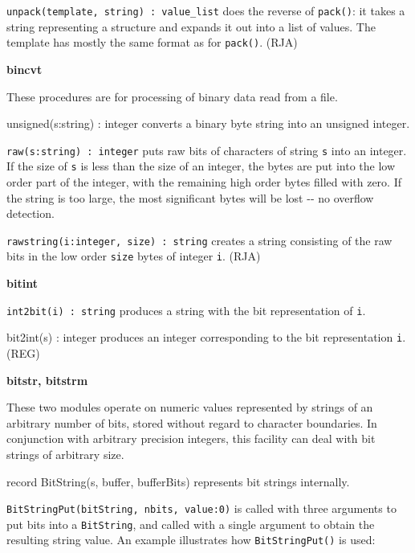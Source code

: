 \texttt{unpack(template, string) : value\_list} does the reverse of
\texttt{pack()}: it takes a string representing a structure and expands
it out into a list of values. The template has mostly the same format
as for \texttt{pack()}. (RJA)

{\sffamily\bfseries
bincvt}

These procedures are for processing of binary data
read from a file.

\textsf{unsigned(s:string) : integer} converts a binary byte string into
an unsigned integer.

\texttt{raw(s:string) : integer} puts raw bits of characters of string
\texttt{s} into an integer. If the size of \texttt{s} is less than the
size of an integer, the bytes are put into the low order part of the
integer, with the remaining high order bytes filled with zero. If the
string is too large, the most significant bytes will be lost -{}- no
overflow detection.

\texttt{rawstring(i:integer, size) : string} creates a string consisting
of the raw bits in the low order \texttt{size} bytes of integer
\texttt{i}. (RJA)

{\sffamily\bfseries
bitint}

\texttt{int2bit(i) : string} produces a string with the bit
representation of \texttt{i}.

\textsf{bit2int(s) : integer} produces an integer corresponding to the
bit representation \texttt{i}. (REG)

{\sffamily\bfseries
bitstr, bitstrm}

These two modules operate on numeric values represented by strings of an
arbitrary number of bits, stored without regard to character
boundaries. In conjunction with arbitrary precision integers, this
facility can deal with bit strings of arbitrary size.

record BitString(s, buffer, bufferBits) represents bit
strings internally.

\texttt{BitStringPut(bitString, nbits, value:0)} is called with three
arguments to put bits into a \texttt{BitString}, and called with a
single argument to obtain the resulting string value. An example
illustrates how \texttt{BitStringPut()} is used:


